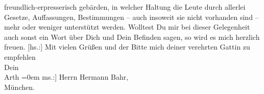\begin{ledgroupsized}[t]{13cm}
               freundlich-erpresserisch gebärden, in welcher Haltung die Leute durch allerlei
               Gesetze, Auffassungen, Bestimmungen – auch insoweit sie nicht vorhanden sind – mehr
               oder weniger unterstützt werden.\pend
           \pstart
           Wolltest Du mir bei dieser Gelegenheit auch sonst ein Wort über Dich und Dein
               Befinden sagen, so wird es mich herzlich freuen.\pend
           \pstart
           {[}hs.:{]} Mit vielen Grüßen und der Bitte mich deiner verehrten Gattin zu empfehlen{\\[\baselineskip]}Dein{\\[\baselineskip]}\spacefill\mbox{Arth}\pend
           \leftskip=0em{}\pstart
           \noindent{}{[}ms.:{]}  Herrn Hermann Bahr,{\\}München.\pend
           \endnumbering{}\end{ledgroupsized}  \newcommand{\dateiname}{L02546}\newcommand{\titel}{Arthur Schnitzler an Hermann Bahr, 5. 9. 1931}\newcommand{\editorInnen}{ Kurt Ifkovits,  Martin Anton Müller}
      